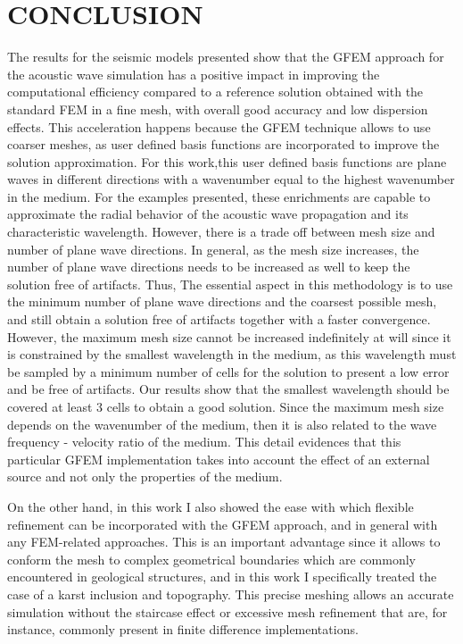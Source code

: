 %
%
%
%



\chapter{\uppercase {Conclusion}}
The results for the seismic models presented show that the GFEM  approach for the  acoustic wave simulation has a positive impact in improving the computational efficiency compared to a reference solution obtained with the standard FEM in a fine mesh, with overall good accuracy and low dispersion effects. This acceleration happens because the GFEM technique allows to use coarser meshes, as user defined basis functions are incorporated to improve the solution approximation. For this work,this user defined basis functions are plane waves in different directions with a wavenumber equal to the highest wavenumber in the medium. For the examples presented, these enrichments are capable to approximate the radial behavior of the acoustic wave propagation and its characteristic wavelength. However, there is a trade off between mesh size and number of plane wave directions. In general, as the mesh size increases, the number of plane wave directions needs to be increased as well to keep the solution free of artifacts. Thus, The essential aspect in this methodology is to use the minimum number of plane wave directions and the coarsest possible mesh, and still obtain a solution free of artifacts together with a faster convergence.  However, the maximum mesh size cannot be increased indefinitely at will since it is constrained by the smallest wavelength in the medium, as this wavelength must be sampled by a minimum number of cells for the solution to present a low error and be free of artifacts. Our results show that the smallest wavelength should be covered at least 3 cells to obtain a good solution. Since the maximum mesh size depends on the wavenumber of the medium, then it is also related to the wave frequency - velocity ratio of the medium. This detail evidences that this particular GFEM implementation takes into account the effect of an external source and not only the properties of the medium. 

On the other hand, in this work I also showed the ease with which flexible refinement can be incorporated with the GFEM approach, and in general with any FEM-related approaches. This is an important advantage since it allows to conform the mesh to complex geometrical boundaries which are commonly encountered in geological structures, and in this work I specifically treated the case of a karst inclusion and topography. This precise meshing allows an accurate simulation without the staircase effect or excessive mesh refinement that are, for instance,  commonly present in finite difference implementations.




